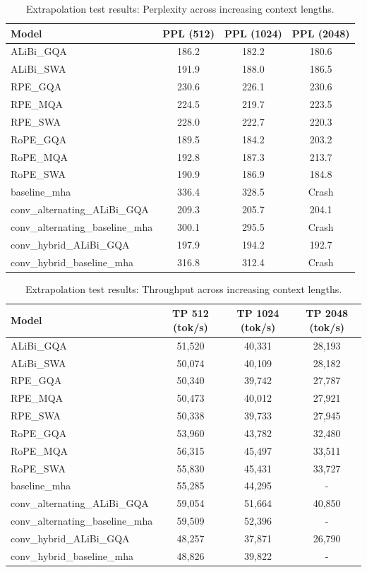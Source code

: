 \documentclass[10pt]{article}
\theoremstyle{plain}
\begin{document}
\begin{table}[H]
\centering
\caption{Extrapolation test results: Perplexity across increasing context lengths.}
\label{tab:extrapolation_ppl}
\begin{tabular}{lccc}
\toprule
Model & PPL (512) & PPL (1024) & PPL (2048) \\
\midrule
ALiBi\_GQA & 186.2 & 182.2 & 180.6 \\
ALiBi\_SWA & 191.9 & 188.0 & 186.5 \\
RPE\_GQA & 230.6 & 226.1 & 230.6 \\
RPE\_MQA & 224.5 & 219.7 & 223.5 \\
RPE\_SWA & 228.0 & 222.7 & 220.3 \\
RoPE\_GQA & 189.5 & 184.2 & 203.2 \\
RoPE\_MQA & 192.8 & 187.3 & 213.7 \\
RoPE\_SWA & 190.9 & 186.9 & 184.8 \\
baseline\_mha & 336.4 & 328.5 & Crash \\
conv\_alternating\_ALiBi\_GQA & 209.3 & 205.7 & 204.1 \\
conv\_alternating\_baseline\_mha & 300.1 & 295.5 & Crash \\
conv\_hybrid\_ALiBi\_GQA & 197.9 & 194.2 & 192.7 \\
conv\_hybrid\_baseline\_mha & 316.8 & 312.4 & Crash \\
\bottomrule
\end{tabular}
\end{table}

\begin{table}[H]
\centering
\caption{Extrapolation test results: Throughput across increasing context lengths.}
\label{tab:extrapolation_throughput}
\begin{tabular}{lccc}
\toprule
Model & TP 512 (tok/s) & TP 1024 (tok/s) & TP 2048 (tok/s) \\
\midrule
ALiBi\_GQA & 51,520 & 40,331 & 28,193 \\
ALiBi\_SWA & 50,074 & 40,109 & 28,182 \\
RPE\_GQA & 50,340 & 39,742 & 27,787 \\
RPE\_MQA & 50,473 & 40,012 & 27,921 \\
RPE\_SWA & 50,338 & 39,733 & 27,945 \\
RoPE\_GQA & 53,960 & 43,782 & 32,480 \\
RoPE\_MQA & 56,315 & 45,497 & 33,511 \\
RoPE\_SWA & 55,830 & 45,431 & 33,727 \\
baseline\_mha & 55,285 & 44,295 & - \\
conv\_alternating\_ALiBi\_GQA & 59,054 & 51,664 & 40,850 \\
conv\_alternating\_baseline\_mha & 59,509 & 52,396 & - \\
conv\_hybrid\_ALiBi\_GQA & 48,257 & 37,871 & 26,790 \\
conv\_hybrid\_baseline\_mha & 48,826 & 39,822 & - \\
\bottomrule
\end{tabular}
\end{table}
\end{document}
